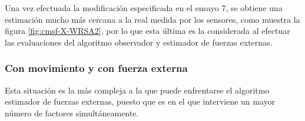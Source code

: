 \begin{itemize}
Una vez efectuada la modificación especificada en el ensayo 7, se obtiene una estimación mucho más cercana a la real medida por los sensores, como muestra la figura \ref{fig:cmsf-X-WRSA2}, por lo que esta última es la considerada al efectuar las evaluaciones del algoritmo observador y estimador de fuerzas externas. \par 

\end{itemize}

\subsubsection{Con movimiento y con fuerza externa}

Esta situación es la más compleja a la que puede enfrentarse el algoritmo estimador de fuerzas externas, puesto que es en el que interviene un mayor número de factores simultáneamente. \par 


